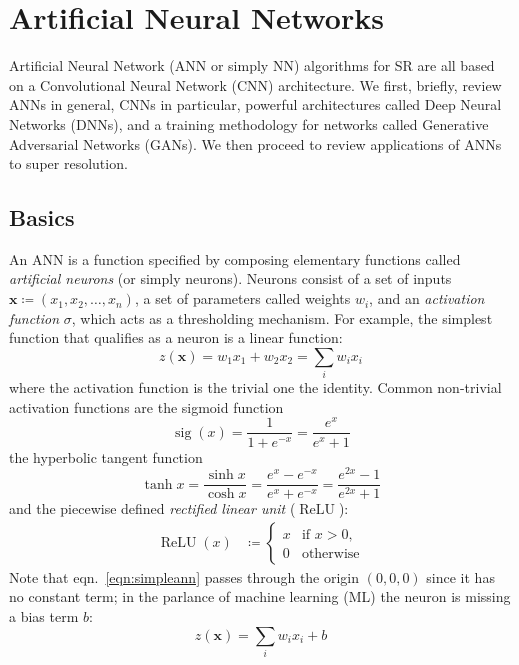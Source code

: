 \section{Artificial Neural Networks}\label{sec:neural-networks}

\localtableofcontents

Artificial Neural Network (ANN or simply NN) algorithms for SR are all based on a Convolutional Neural Network (CNN) architecture.
%
We first, briefly, review ANNs in general, CNNs in particular, powerful architectures called Deep Neural Networks (DNNs), and a training methodology for networks called Generative Adversarial Networks (GANs).
%
We then proceed to review applications of ANNs to super resolution.
%
\subsection{Basics}

An ANN is a function specified by composing elementary functions called \textit{artificial neurons} (or simply neurons).
%
Neurons consist of a set of inputs \(\mathbf{x} \coloneqq (x_1, x_2, \dots, x_n)\), a set of parameters called weights \(w_i\), and an \textit{activation function} \(\sigma\), which acts as a thresholding mechanism.
%
For example, the simplest function that qualifies as a neuron is a linear function:
\begin{equation}
    z(\mathbf{x}) = w_1 x_1 + w_2 x_2 = \sum_i w_i x_i
    \label{eqn:simpleann}
\end{equation}
where the activation function is the trivial one the identity.
%
Common non-trivial activation functions are the sigmoid function
\begin{equation}
    \operatorname{sig}(x)={\frac {1}{1+e^{-x}}}={\frac {e^{x}}{e^{x}+1}}
\end{equation}
the hyperbolic tangent function
\begin{equation}
    \tanh x={\frac {\sinh x}{\cosh x}}={\frac {e^{x}-e^{-x}}{e^{x}+e^{-x}}}={\frac {e^{2x}-1}{e^{2x}+1}}
\end{equation}
and the piecewise defined \textit{rectified linear unit} (\(\operatorname{ReLU}\)):
\begin{align}
    \operatorname{ReLU}(x) & \coloneqq \begin{cases}x&{\text{if }}x>0,\\0&{\text{otherwise}}\end{cases} 
\end{align}
Note that eqn.~\eqref{eqn:simpleann} passes through the origin \((0,0,0)\) since it has no constant term; in the parlance of machine learning (ML) the neuron is missing a bias term \(b\):
\begin{equation}
    z(\mathbf{x}) = \sum_i w_i x_i + b
    \label{eqn:linearregr}
\end{equation}

